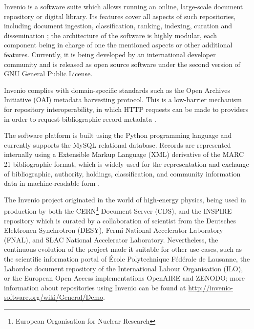 
Invenio \cite{ref:invenio} is a software suite which allows running an online,
large-scale document repository or digital library. Its features cover all
aspects of such repositories, including document ingestion, classification,
ranking, indexing, curation and dissemination \cite{ref:kaplun, ref:glauner};
the architecture of the software is highly modular, each component being in
charge of one the mentioned aspects or other additional features. Currently, it
is being developed by an international developer community and is released as
open source software under the second version of GNU General Public License.

Invenio complies with domain-specific standards such as the Open Archives
Initiative (OAI) metadata harvesting protocol. This is a low-barrier mechanism for
repository interoperability, in which HTTP requests can be made to providers in
order to request bibliographic record metadata \cite{ref:oai}.

The software platform is built using the Python programming language and
currently supports the MySQL relational database. Records are represented
internally using a Extensible Markup Language (XML) derivative of the MARC 21
bibliographic format, which is widely used for the representation and exchange
of bibliographic, authority, holdings, classification, and community
information data in machine-readable form \cite{ref:marc}.

The Invenio project originated in the world of high-energy physics, being used
in production by both the CERN\footnote{European Organisation for Nuclear
Research} Document Server (CDS), and the INSPIRE repository which is curated
by a collaboration of scientist from the Deutsches Elektronen-Synchrotron
(DESY), Fermi National Accelerator Laboratory (FNAL), and SLAC National
Accelerator Laboratory. Nevertheless, the continuous evolution of the project
made it suitable for other use-cases, such as the scientific information portal
of \'{E}cole Polytechnique F\'{e}d\'{e}rale de Lausanne, the Labordoc document
repository of the International Labour Organisation (ILO), or the European Open
Access implementations OpenAIRE and ZENODO; more information about repositories
using Invenio can be found at
\url{http://invenio-software.org/wiki/General/Demo}.
